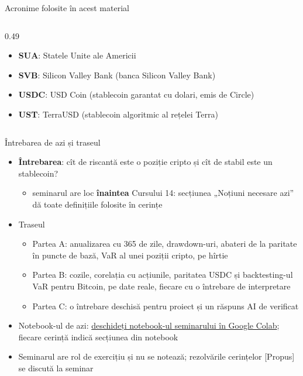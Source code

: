 \begin{frame}{Acronime folosite în acest material}
\begin{columns}[T]
\begin{column}{0.49\textwidth}
\begin{itemize}\setlength{\itemsep}{0pt}
    \item \textbf{SUA}: Statele Unite ale Americii
    \item \textbf{SVB}: Silicon Valley Bank (banca Silicon Valley Bank)
    \item \textbf{USDC}: USD Coin (stablecoin garantat cu dolari, emis de Circle)
    \item \textbf{UST}: TerraUSD (stablecoin algoritmic al rețelei Terra)
\end{itemize}
\end{column}
\end{columns}
\end{frame}

\begin{frame}{Întrebarea de azi și traseul}
\itemsize{\small}
\begin{itemize}
    \item \textbf{Întrebarea}: cît de riscantă este o poziție cripto și cît de stabil este un stablecoin?
    \begin{itemize}
        \item seminarul are loc \textbf{înaintea} Cursului 14: secțiunea „Noțiuni necesare azi” dă toate definițiile folosite în cerințe
    \end{itemize}
    \item Traseul
    \begin{itemize}
        \item Partea A: anualizarea cu 365 de zile, drawdown-uri, abateri de la paritate în puncte de bază, VaR al unei poziții cripto, pe hîrtie
        \item Partea B: cozile, corelația cu acțiunile, paritatea USDC și backtesting-ul VaR pentru Bitcoin, pe date reale, fiecare cu o întrebare de interpretare
        \item Partea C: o întrebare deschisă pentru proiect și un răspuns AI de verificat
    \end{itemize}
    \item Notebook-ul de azi: \href{\nb}{deschideți notebook-ul seminarului în Google Colab}; fiecare cerință indică secțiunea din notebook
    \item Seminarul are rol de exercițiu și nu se notează; rezolvările cerințelor [Propus] se discută la seminar
\end{itemize}
\end{frame}

